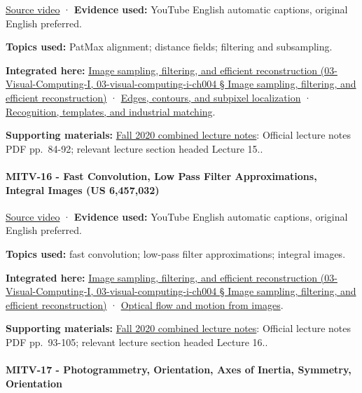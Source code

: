 \href{https://www.youtube.com/watch?v=R1yLwFOfwwc}{Source video} · \textbf{Evidence used:} YouTube English automatic captions, original English preferred.

\textbf{Topics used:} PatMax alignment; distance fields; filtering and subsampling.

\textbf{Integrated here:} \href{}{Image sampling, filtering, and efficient reconstruction (03-Visual-Computing-I, 03-visual-computing-i-ch004 § Image sampling, filtering, and efficient reconstruction)} · \hyperref[04-visual-computing-ii-ch030]{Edges, contours, and subpixel localization} · \hyperref[04-visual-computing-ii-ch030]{Recognition, templates, and industrial matching}.

\textbf{Supporting materials:} \href{https://ocw.mit.edu/courses/6-801-machine-vision-fall-2020/9ec44f69e72995c370b3797818ba01e6_MIT6_801F20_lectureNotes.pdf}{Fall 2020 combined lecture notes}: Official lecture notes PDF pp.~84-92; relevant lecture section headed Lecture 15..

\paragraph{MITV-16 - Fast Convolution, Low Pass Filter Approximations, Integral Images (US 6,457,032)}\label{mitv-16---fast-convolution-low-pass-filter-approximations-integral-images-us-6457032}

\href{https://www.youtube.com/watch?v=tblzZhYZtvU}{Source video} · \textbf{Evidence used:} YouTube English automatic captions, original English preferred.

\textbf{Topics used:} fast convolution; low-pass filter approximations; integral images.

\textbf{Integrated here:} \href{}{Image sampling, filtering, and efficient reconstruction (03-Visual-Computing-I, 03-visual-computing-i-ch004 § Image sampling, filtering, and efficient reconstruction)} · \hyperref[04-visual-computing-ii-ch030]{Optical flow and motion from images}.

\textbf{Supporting materials:} \href{https://ocw.mit.edu/courses/6-801-machine-vision-fall-2020/9ec44f69e72995c370b3797818ba01e6_MIT6_801F20_lectureNotes.pdf}{Fall 2020 combined lecture notes}: Official lecture notes PDF pp.~93-105; relevant lecture section headed Lecture 16..

\paragraph{MITV-17 - Photogrammetry, Orientation, Axes of Inertia, Symmetry, Orientation}\label{mitv-17---photogrammetry-orientation-axes-of-inertia-symmetry-orientation}

